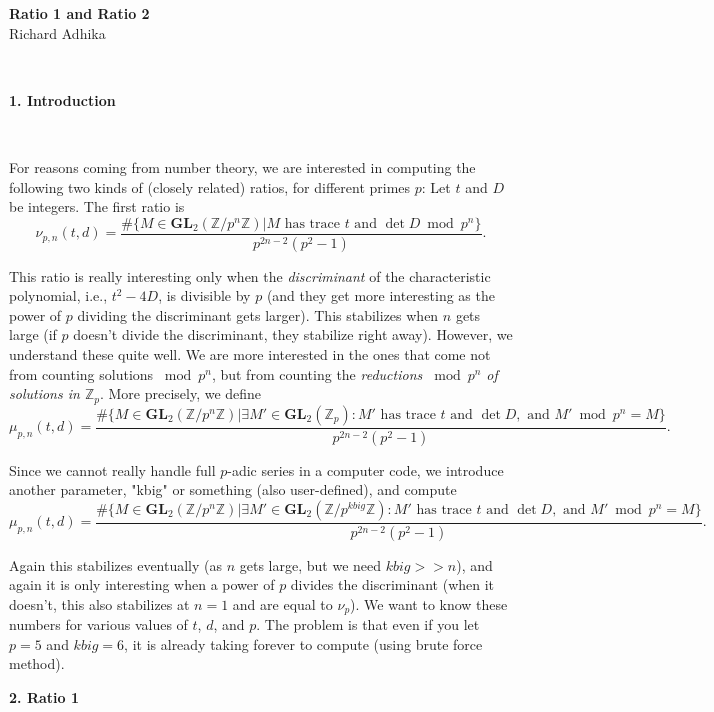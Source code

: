 \documentclass[letterpaper,12pt]{article}
\newcommand{\Z}{\mathbb{Z}}
\newcommand{\GL}{\mathbf {GL}}
\begin{document}
\begin{center}
    {\bf \Huge Ratio 1 and Ratio 2} \\
    Richard Adhika
\end{center}

\

{\bf \LARGE 1. Introduction}

\

For reasons coming from number theory, we are interested in computing the following two kinds of (closely related) ratios, for different primes $p$: 
Let $t$ and $D$ be integers.  
The first ratio is 
\[
\nu_{p, n} (t, d) = \frac{\#\{M\in \GL_2(\Z/p^n\Z) \vert M \text{ has trace } t \text{ and } \det  D  \bmod p^n\} }{p^{2n-2}(p^2-1)}.
\]

This ratio is really interesting only when the \emph{discriminant} of the characteristic polynomial, i.e., 
$t^2-4D$, is divisible by $p$ (and they get more interesting as the power of $p$ dividing the discriminant gets larger). 
This stabilizes when $n$ gets large (if $p$ doesn't divide the discriminant, they stabilize right away). 
However, we understand these quite well. We are more interested in the ones that come not from counting solutions $\bmod p^n$, but from counting the \emph{reductions  $\bmod p^n$ of solutions in $\Z_p$}. 
More precisely, we define 
\[
\mu_{p, n} (t, d) = \frac{\#\{M\in \GL_2(\Z/p^n\Z) \vert \exists M'\in \GL_2(\Z_p):  M' \text{ has trace } t \text{ and }  \det  D, \text { and } M' \bmod p^n = M \} } 
{p^{2n-2}(p^2-1)}.
\]

Since we cannot really handle full $p$-adic series in a computer code, we introduce another parameter, "kbig" or something (also user-defined), and compute 
\[
\mu_{p, n} (t, d) = \frac{\#\{M\in \GL_2(\Z/p^n\Z) \vert \exists M'\in \GL_2(\Z/p^{kbig}\Z):  M' \text{ has trace } t \text{ and }  \det  D, \text { and } M' \bmod p^n = M \} } 
{p^{2n-2}(p^2-1)}.
\]

Again this stabilizes eventually (as $n$ gets large, but we need $kbig>>n$), and again it is only interesting when a power of $p$ divides the discriminant (when it doesn't, this also stabilizes at $n=1$ and are equal to $\nu_p$). 
We want to know these numbers for various values of $t$, $d$, and $p$.
The problem is that even if you let $p=5$ and $kbig=6$, it is already taking forever to compute 
(using brute force method). 

\vspace{0.6in}

{\bf \LARGE 2. Ratio 1}
\end{document}
